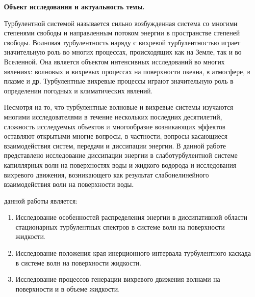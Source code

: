 
{\actuality}\textbf{ Объект исследования и актуальность темы.}

Турбулентной системой называется сильно возбужденная система со многими степенями свободы и направленным потоком энергии в пространстве степеней свободы. Волновая турбулентность наряду с вихревой турбулентностью играет значительную роль во многих процессах, происходящих как на Земле, так и во Вселенной. Она является объектом  интенсивных исследований во многих явлениях: волновых и вихревых процессах на поверхности океана, в атмосфере, в плазме и др. Турбулентные вихревые процессы играют значительную роль в определении погодных и климатических явлений. 

Несмотря на то, что турбулентные волновые и вихревые системы изучаются многими исследователями в течение нескольких последних десятилетий, сложность исследуемых объектов и многообразие возникающих эффектов оставляют открытыми многие вопросы, в частности, вопросы касающиеся взаимодействия систем, передачи и диссипации энергии. 
В данной работе представлено исследование диссипации энергии в слаботурбулентной системе капиллярных волн на поверхностях воды и жидкого водорода и исследования вихревого движения, возникающего как результат слабонелинейного взаимодействия волн на поверхности воды.

{\aim} данной работы является: 
\begin{enumerate}
	\item Исследование особенностей распределения энергии в диссипативной области стационарных турбулентных спектров в системе волн на поверхности жидкости.
	\item Исследование положения края инерционного интервала турбулентного каскада в системе волн на поверхности жидкости.
	\item Исследование процессов генерации вихревого движения волнами на поверхности и в объеме жидкости.
\end{enumerate}

